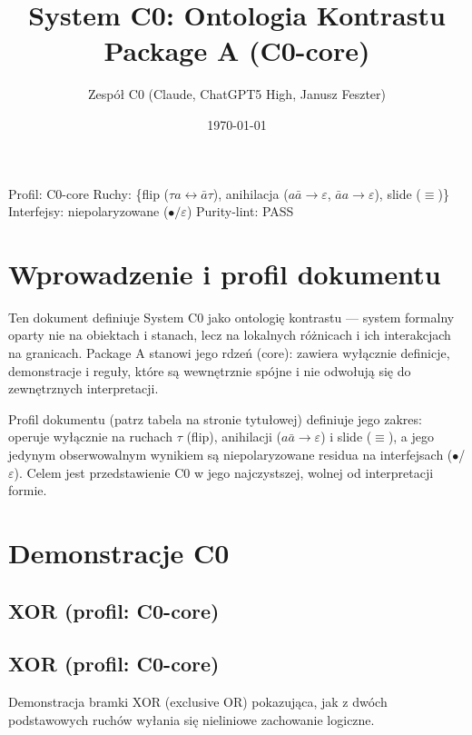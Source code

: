 \documentclass[11pt,a4paper]{article}
\title{System C0: Ontologia Kontrastu\\[4pt]\large Package A (C0-core)}
\author{Zespół C0 (Claude, ChatGPT5 High, Janusz Feszter)}\date{\today}
\newcommand{\flip}{\(\tau\)} %
\newcommand{\voids}{\(\varepsilon\)} %
\newcommand{\resdot}{\(\bullet\)} %
\begin{document}
\maketitle

\begin{tcolorbox}[colback=black!1,colframe=black!15,title=Profil i metadane]
Profil: C0-core \quad Ruchy: \{flip (\(\tau a \leftrightarrow \bar{a}\tau\)), anihilacja (\(a\bar{a}\to\varepsilon\), \(\bar{a}a\to\varepsilon\)), slide (\(\equiv\))\}\\
Interfejsy: niepolaryzowane (\(\bullet/\varepsilon\)) \quad Purity-lint: PASS
\end{tcolorbox}

\tableofcontents\bigskip

\section{Wprowadzenie i profil dokumentu}

Ten dokument definiuje System C0 jako ontologię kontrastu — system formalny oparty nie na obiektach i stanach, lecz na lokalnych różnicach i ich interakcjach na granicach. Package A stanowi jego rdzeń (core): zawiera wyłącznie definicje, demonstracje i reguły, które są wewnętrznie spójne i nie odwołują się do zewnętrznych interpretacji.

Profil dokumentu (patrz tabela na stronie tytułowej) definiuje jego zakres: operuje wyłącznie na ruchach \flip{} (flip), anihilacji (\(a\bar{a}\to\varepsilon\)) i slide (\(\equiv\)), a jego jedynym obserwowalnym wynikiem są niepolaryzowane residua na interfejsach (\resdot/\voids). Celem jest przedstawienie C0 w jego najczystszej, wolnej od interpretacji formie.

\section{Demonstracje C0}
\subsection{XOR (profil: C0-core)}


\subsection{XOR (profil: C0-core)}
Demonstracja bramki XOR (exclusive OR) pokazująca, jak z dwóch podstawowych ruchów wyłania się nieliniowe zachowanie logiczne.
\end{document}
